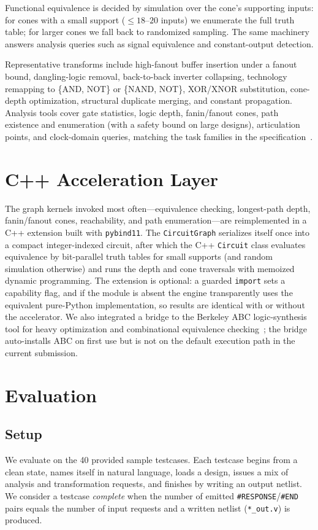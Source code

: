 \documentclass[conference]{IEEEtran}
\begin{document}
Functional equivalence is decided by simulation over the cone's supporting
inputs: for cones with a small support ($\le 18$--$20$ inputs) we enumerate the
full truth table; for larger cones we fall back to randomized sampling. The
same machinery answers analysis queries such as signal equivalence and
constant-output detection.

Representative transforms include high-fanout buffer insertion under a fanout
bound, dangling-logic removal, back-to-back inverter collapsing, technology
remapping to \{AND, NOT\} or \{NAND, NOT\}, XOR/XNOR substitution, cone-depth
optimization, structural duplicate merging, and constant propagation. Analysis
tools cover gate statistics, logic depth, fanin/fanout cones, path existence
and enumeration (with a safety bound on large designs), articulation points,
and clock-domain queries, matching the task families in the
specification~\cite{problemA}.

\section{C++ Acceleration Layer}
The graph kernels invoked most often---equivalence checking, longest-path
depth, fanin/fanout cones, reachability, and path enumeration---are
reimplemented in a C++ extension built with \texttt{pybind11}. The
\texttt{CircuitGraph} serializes itself once into a compact integer-indexed
circuit, after which the C++ \texttt{Circuit} class evaluates equivalence by
bit-parallel truth tables for small supports (and random simulation otherwise)
and runs the depth and cone traversals with memoized dynamic programming. The
extension is optional: a guarded \texttt{import} sets a capability flag, and if
the module is absent the engine transparently uses the equivalent pure-Python
implementation, so results are identical with or without the accelerator. We
also integrated a bridge to the Berkeley ABC logic-synthesis tool for heavy
optimization and combinational equivalence checking~\cite{abc}; the bridge
auto-installs ABC on first use but is not on the default execution path in the
current submission.

\section{Evaluation}
\subsection{Setup}
We evaluate on the 40 provided sample testcases. Each testcase begins from a
clean state, names itself in natural language, loads a design, issues a mix of
analysis and transformation requests, and finishes by writing an output
netlist. We consider a testcase \emph{complete} when the number of emitted
\texttt{\#RESPONSE}/\texttt{\#END} pairs equals the number of input requests
and a written netlist (\texttt{*\_out.v}) is produced.
\end{document}
